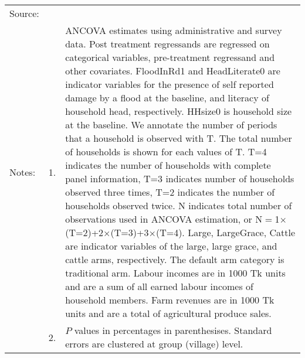 \begin{minipage}[t]{14cm}
\renewcommand{\arraystretch}{.8}
\setlength{\tabcolsep}{1pt}
\begin{tabular}{>{\hfill\scriptsize}p{1cm}<{}>{\hfill\scriptsize}p{.25cm}<{}>{\scriptsize}p{12cm}<{\hfill}}
Source:& \multicolumn{2}{l}{\scriptsize Estimated with GUK administrative and survey data.}\\
Notes: & 1. & ANCOVA estimates using administrative and survey data. Post treatment regressands are regressed on categorical variables, pre-treatment regressand and other covariates. \textsf{FloodInRd1} and \textsf{HeadLiterate0} are indicator variables for the presence of self reported damage by a flood at the baseline, and literacy of household head, respectively. \textsf{HHsize0} is household size at the baseline. We annotate the number of periods that a household is observed with \textsf{T}. The total number of households is shown for each values of \textsf{T}. \textsf{T=4} indicates the number of households with complete panel information, \textsf{T=3} indicates number of households observed three times, \textsf{T=2} indicates the number of households observed twice. \textsf{N} indicates total number of observations used in ANCOVA estimation, or \textsf{N$=$1$\times$(T=2)+2$\times$(T=3)+3$\times$(T=4)}.  \textsf{Large}, \textsf{LargeGrace}, \textsf{Cattle} are indicator variables of the \textsf{large}, \textsf{large grace}, and \textsf{cattle} arms, respectively. The default arm category is \textsf{traditional} arm. Labour incomes are in 1000 Tk units and are a sum of all earned labour incomes of household members. Farm revenues are in 1000 Tk units and are a total of agricultural produce sales.  \\
& 2. & $P$ values in percentages in parenthesises. Standard errors are clustered at group (village) level.
\end{tabular}
\end{minipage}

